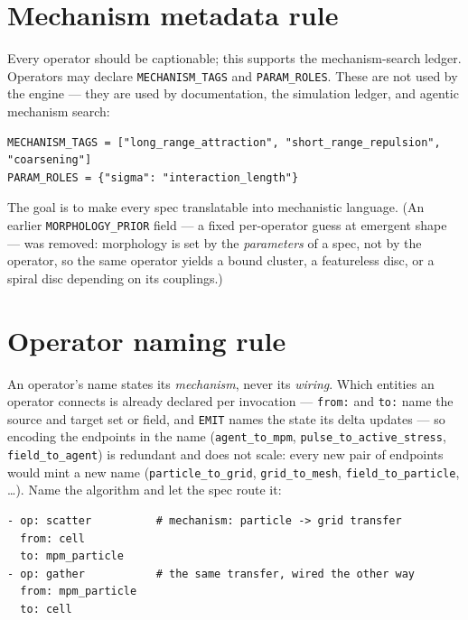 \documentclass[11pt]{article}
\newcommand{\code}[1]{\texttt{#1}}
\begin{document}
\section{Mechanism metadata rule}

Every operator should be captionable; this supports the mechanism-search ledger.
Operators may declare \code{MECHANISM\_TAGS} and \code{PARAM\_ROLES}. These are not
used by the engine --- they are used by documentation, the simulation ledger, and
agentic mechanism search:
\begin{lstlisting}[style=yaml]
MECHANISM_TAGS = ["long_range_attraction", "short_range_repulsion", "coarsening"]
PARAM_ROLES = {"sigma": "interaction_length"}
\end{lstlisting}
The goal is to make every spec translatable into mechanistic language. (An earlier
\code{MORPHOLOGY\_PRIOR} field --- a fixed per-operator guess at emergent shape --- was
removed: morphology is set by the \emph{parameters} of a spec, not by the operator, so
the same operator yields a bound cluster, a featureless disc, or a spiral disc
depending on its couplings.)

\section{Operator naming rule}
\label{sec:naming}

An operator's name states its \emph{mechanism}, never its \emph{wiring}. Which entities
an operator connects is already declared per invocation --- \code{from:} and \code{to:}
name the source and target set or field, and \code{EMIT} names the state its delta
updates --- so encoding the endpoints in the name (\code{agent\_to\_mpm},
\code{pulse\_to\_active\_stress}, \code{field\_to\_agent}) is redundant and does not scale:
every new pair of endpoints would mint a new name (\code{particle\_to\_grid},
\code{grid\_to\_mesh}, \code{field\_to\_particle}, \ldots). Name the algorithm and let the
spec route it:

\begin{lstlisting}[style=yaml]
- op: scatter          # mechanism: particle -> grid transfer
  from: cell
  to: mpm_particle
- op: gather           # the same transfer, wired the other way
  from: mpm_particle
  to: cell
\end{lstlisting}
\end{document}
